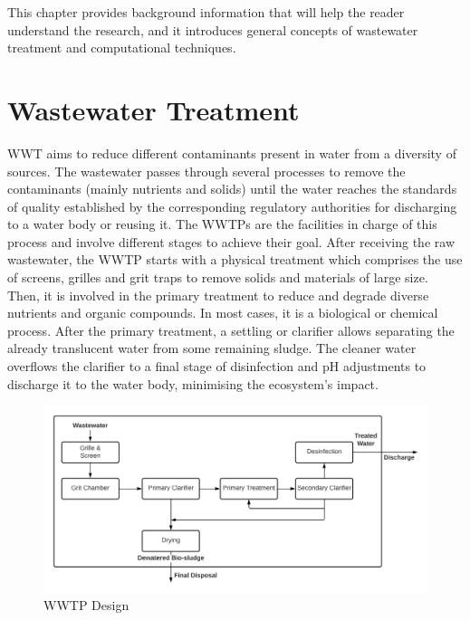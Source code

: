 This chapter provides background information that will help the reader understand the research, and it introduces general concepts of wastewater treatment and computational techniques. 

\section{Wastewater Treatment}
\label{s:First-Background-Topic}

\ac{WWT} aims to reduce different contaminants present in water from a diversity of sources. The wastewater passes through several processes to remove the contaminants (mainly nutrients and solids) until the water reaches the standards of quality established by the corresponding regulatory authorities for discharging to a water body or reusing it. The \ac{WWTP}s are the facilities in charge of this process and involve different stages to achieve their goal. After receiving the raw wastewater, the \ac{WWTP} starts with a physical treatment which comprises the use of screens, grilles and grit traps to remove solids and materials of large size. Then, it is involved in the primary treatment to reduce and degrade diverse nutrients and organic compounds. In most cases, it is a biological or chemical process. After the primary treatment, a settling or clarifier allows separating the already translucent water from some remaining sludge. The cleaner water overflows the clarifier to a final stage of disinfection and pH adjustments to discharge it to the water body, minimising the ecosystem's impact.

\begin{figure}[h]
\centering
\includegraphics[width=15cm]{figures/Ch2/WWTP.png}
\caption{WWTP Design}
\label{f:wwtp}
\end{figure}


